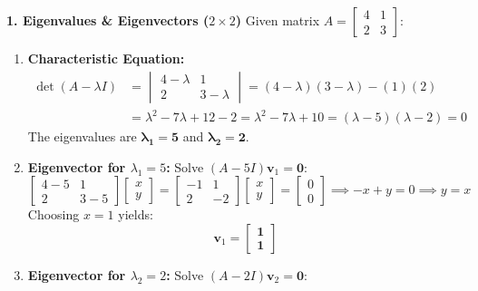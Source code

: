 \textbf{1. Eigenvalues \& Eigenvectors ($2 \times 2$)}
Given matrix $A = \begin{bmatrix} 4 & 1 \\ 2 & 3 \end{bmatrix}$:
\begin{enumerate}
    \item \textbf{Characteristic Equation:}
    \begin{align*}
    \det(A - \lambda I) &= \begin{vmatrix} 4 - \lambda & 1 \\ 2 & 3 - \lambda \end{vmatrix} = (4 - \lambda)(3 - \lambda) - (1)(2) \\
    &= \lambda^2 - 7\lambda + 12 - 2 = \lambda^2 - 7\lambda + 10 = (\lambda - 5)(\lambda - 2) = 0
    \end{align*}
    The eigenvalues are $\mathbf{\lambda_1 = 5}$ and $\mathbf{\lambda_2 = 2}$.
    \item \textbf{Eigenvector for $\lambda_1 = 5$:}
    Solve $(A - 5I)\mathbf{v}_1 = \mathbf{0}$:
    \begin{equation*}
    \begin{bmatrix} 4 - 5 & 1 \\ 2 & 3 - 5 \end{bmatrix} \begin{bmatrix} x \\ y \end{bmatrix} = \begin{bmatrix} -1 & 1 \\ 2 & -2 \end{bmatrix} \begin{bmatrix} x \\ y \end{bmatrix} = \begin{bmatrix} 0 \\ 0 \end{bmatrix} \implies -x + y = 0 \implies y = x
    \end{equation*}
    Choosing $x = 1$ yields:
    \begin{equation*}
    \mathbf{v}_1 = \mathbf{\begin{bmatrix} 1 \\ 1 \end{bmatrix}}
    \end{equation*}
    \item \textbf{Eigenvector for $\lambda_2 = 2$:}
    Solve $(A - 2I)\mathbf{v}_2 = \mathbf{0}$:
    \begin{equation*}

\end{equation*}
\end{enumerate}
